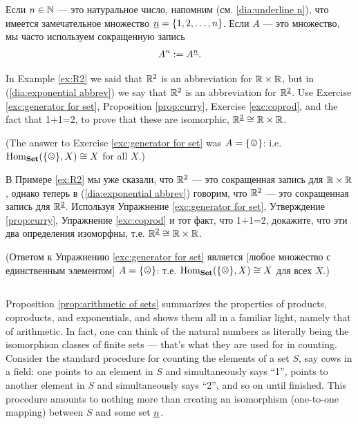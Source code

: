 \documentclass[CT4S-EN-RU]{subfiles}
\begin{document}
\begin{blockRUS}
Если $n\in{\mathbb N}$ — это натуральное число, напомним (см. \ref{dia:underline n}), что имеется замечательное множество $\underline{n}=\{1,2,\ldots,n\}$. Если $A$ — это множество, мы часто используем сокращенную запись
\begin{align}\label{dia:exponential abbrev}
A^n:=A^{\underline{n}}.
\end{align}
\end{blockRUS}

\begin{exerciseENG}\label{exc:two R2s}
In Example \ref{ex:R2} we said that ${\mathbb R}^2$ is an abbreviation for ${\mathbb R}\times{\mathbb R}$, but in (\ref{dia:exponential abbrev}) we say that ${\mathbb R}^2$ is an abbreviation for ${\mathbb R}^{\underline{2}}$. Use Exercise \ref{exc:generator for set}, Proposition \ref{prop:curry}, Exercise \ref{exc:coprod}, and the fact that 1+1=2, to prove that these are isomorphic, ${\mathbb R}^{\underline{2}}\cong{\mathbb R}\times{\mathbb R}$.

(The answer to Exercise \ref{exc:generator for set} was $A=\singleton$: i.e. $\Hom_\Set(\singleton,X)\iso X$ for all $X$.)
\end{exerciseENG}

\begin{exerciseRUS}\label{exc:two R2s}
В Примере \ref{ex:R2} мы уже сказали, что ${\mathbb R}^2$ — это сокращенная запись для ${\mathbb R}\times{\mathbb R}$, однако теперь в (\ref{dia:exponential abbrev}) говорим, что ${\mathbb R}^2$ — это сокращенная запись для ${\mathbb R}^{\underline{2}}$. Используя Упражнение \ref{exc:generator for set}, Утверждение \ref{prop:curry}, Упражнение \ref{exc:coprod} и тот факт, что 1+1=2, докажите, что эти два определения изоморфны, т.е. ${\mathbb R}^{\underline{2}}\cong{\mathbb R}\times{\mathbb R}$.

(Ответом к Упражнению \ref{exc:generator for set} является [любое множество с единственным элементом] $A=\singleton$: т.е. $\Hom_\Set(\singleton,X)\iso X$ для всех $X$.)
\end{exerciseRUS}


\subsection{}\label{sec:arithmetic of sets}

\begin{blockENG}
Proposition \ref{prop:arithmetic of sets} summarizes the properties of products, coproducts, and exponentials, and shows them all in a familiar light, namely that of arithmetic. In fact, one can think of the natural numbers as literally being the isomorphism classes of finite sets — that's what they are used for in counting. Consider the standard procedure for counting the elements of a set $S$, say cows in a field: one points to an element in $S$ and simultaneously says “1”, points to another element in $S$ and simultaneously says “2”, and so on until finished. This procedure amounts to nothing more than creating an isomorphism (one-to-one mapping) between $S$ and some set $\underline{n}$. 
\end{blockENG}
\end{document}
